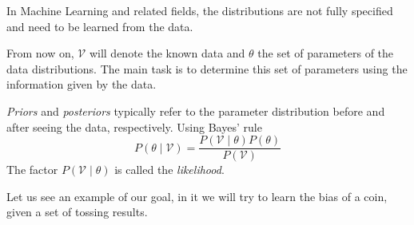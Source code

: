 

In Machine Learning and related fields, the distributions are not fully specified
and need to be learned from the data.

From now on, \(\mathcal{V}\) will denote the known data and \(\theta\) the set
of parameters of the data distributions. The main task is to determine this set
of parameters using the information given by the data.

\begin{definition}
\emph{Priors} and \emph{posteriors} typically refer to the parameter
distribution before and after seeing the data, respectively. Using Bayes' rule
\[
  P(\theta \mid  \mathcal{V}) = \frac{P(\mathcal{V}  \mid  \theta)P(\theta)}{P(\mathcal{V})}
\]
The factor \(P(\mathcal{V} \mid \theta)\) is called the \emph{likelihood}.
\end{definition}

Let us see an example of our goal, in it we will try to learn the bias of a coin,
given a set of tossing results.

